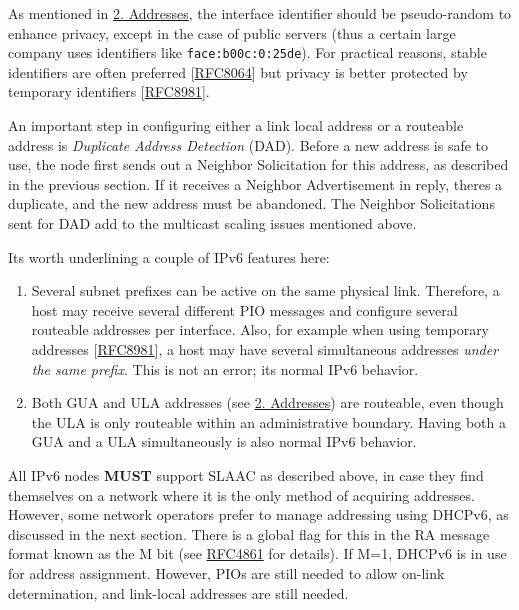 \documentclass[
]{article}
\begin{document}
As mentioned in \hyperref[addresses]{2. Addresses}, the interface
identifier should be pseudo-random to enhance privacy, except in the
case of public servers (thus a certain large company uses identifiers
like \texttt{face:b00c:0:25de}). For practical reasons, stable
identifiers are often preferred
{[}\href{https://www.rfc-editor.org/info/rfc8064}{RFC8064}{]} but
privacy is better protected by temporary identifiers
{[}\href{https://www.rfc-editor.org/info/rfc8981}{RFC8981}{]}.

An important step in configuring either a link local address or a
routeable address is \emph{Duplicate Address Detection} (DAD). Before a
new address is safe to use, the node first sends out a Neighbor
Solicitation for this address, as described in the previous section. If
it receives a Neighbor Advertisement in reply, there\textquotesingle s a
duplicate, and the new address must be abandoned. The Neighbor
Solicitations sent for DAD add to the multicast scaling issues mentioned
above.

It\textquotesingle s worth underlining a couple of IPv6 features here:

\begin{enumerate}
\def\labelenumi{\arabic{enumi}.}
\item
  Several subnet prefixes can be active on the same physical link.
  Therefore, a host may receive several different PIO messages and
  configure several routeable addresses per interface. Also, for example
  when using temporary addresses
  {[}\href{https://www.rfc-editor.org/info/rfc8981}{RFC8981}{]}, a host
  may have several simultaneous addresses \emph{under the same prefix}.
  This is not an error; it\textquotesingle s normal IPv6 behavior.
\item
  Both GUA and ULA addresses (see \hyperref[addresses]{2. Addresses})
  are routeable, even though the ULA is only routeable within an
  administrative boundary. Having both a GUA and a ULA simultaneously is
  also normal IPv6 behavior.
\end{enumerate}

All IPv6 nodes \textbf{MUST} support SLAAC as described above, in case
they find themselves on a network where it is the only method of
acquiring addresses. However, some network operators prefer to manage
addressing using DHCPv6, as discussed in the next section. There is a
global flag for this in the RA message format known as the M bit (see
\href{https://www.rfc-editor.org/info/rfc4861}{RFC4861} for details). If
M=1, DHCPv6 is in use for address assignment. However, PIOs are still
needed to allow on-link determination, and link-local addresses are
still needed.
\end{document}
